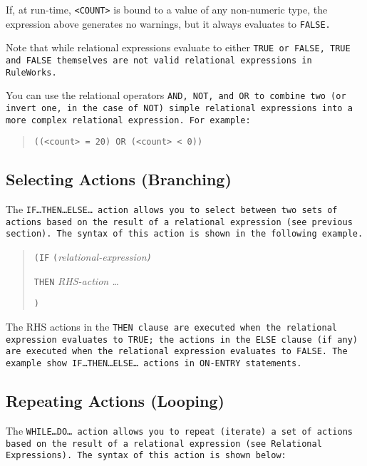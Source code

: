 If, at run-time, \verb|<COUNT>| is bound to a value of any non-numeric
type, the expression above generates no warnings, but it always
evaluates to \tt{FALSE}.

Note that while relational expressions evaluate to either \tt{TRUE} or
\tt{FALSE}, \tt{TRUE} and \tt{FALSE} themselves are not valid
relational expressions in RuleWorks.

You can use the relational operators \tt{AND}, \tt{NOT}, and \tt{OR}
to combine two (or invert one, in the case of \tt{NOT}) simple
relational expressions into a more complex relational expression. For
example:

\begin{quote}
\begin{verbatim}
((<count> = 20) OR (<count> < 0))
\end{verbatim}
\end{quote}

\subsection{Selecting Actions (Branching)}

The \tt{IF}\ldots\tt{THEN}\ldots\tt{ELSE}\ldots{} action allows you to
select between two sets of actions based on the result of a relational
expression (see previous section). The syntax of this action is shown
in the following example.

\begin{quote}
\verb|(IF| \verb|(|\it{relational-expression}\verb|)|\par
\qquad\verb|THEN| \it{RHS-action} \ldots\par
{}\verb|)|
\end{quote}
   
The RHS actions in the \tt{THEN} clause are executed when the
relational expression evaluates to \tt{TRUE}; the actions in the
\tt{ELSE} clause (if any) are executed when the relational expression
evaluates to \tt{FALSE}. The example show
\tt{IF}\ldots\tt{THEN}\ldots\tt{ELSE}\ldots{} actions in \tt{ON-ENTRY}
statements.

\subsection{Repeating Actions (Looping)}

The \tt{WHILE}\ldots\tt{DO}\ldots{} action allows you to repeat
(iterate) a set of actions based on the result of a relational
expression (see Relational Expressions). The syntax of this action is
shown below:

